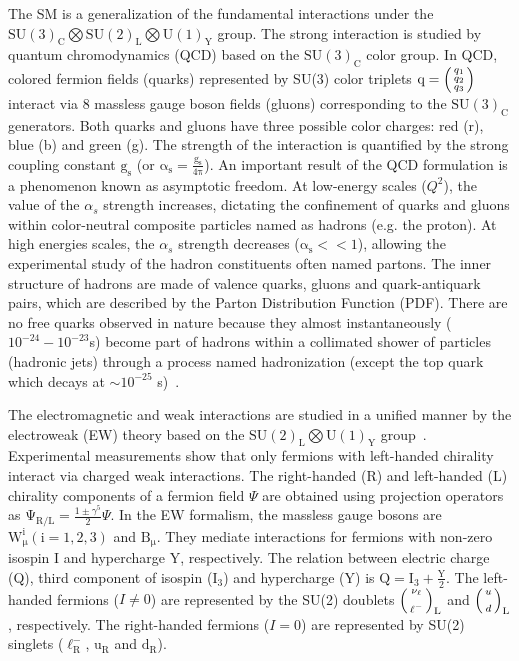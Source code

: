 The SM is a generalization of the fundamental interactions under the $\mathrm{SU(3)_{C} \bigotimes SU(2)_{L}\bigotimes U(1)_{Y} }$ group. The strong interaction is studied by quantum chromodynamics (QCD) based on the $\mathrm{SU(3)_{C}}$ color group. In QCD, colored fermion fields (quarks) represented by SU(3) color triplets $\mathrm{q=\left(\begin{smallmatrix}q_{1}\\q_{2}\\q_{3}\end{smallmatrix}\right)}$ interact via 8 massless gauge boson fields (gluons) corresponding to the $\mathrm{SU(3)_{C}}$ generators. Both quarks and gluons have three possible color charges: red (r), blue (b) and green (g). The strength of the interaction is quantified by the strong coupling constant $\mathrm{g_{s}}$ (or $\mathrm{\alpha_{s} = \frac{g_{s}}{4\pi}}$). An important result of the QCD formulation is a phenomenon known as asymptotic freedom. At low-energy scales ($Q^{2}$), the value of the $\alpha_{s}$ strength increases, dictating the confinement of quarks and gluons within color-neutral composite particles named as hadrons (e.g. the proton). At high energies scales, the $\alpha_{s}$ strength decreases ($\mathrm{\alpha_{s}<<1}$), allowing the experimental study of the hadron constituents often named partons. The inner structure of hadrons are made of valence quarks, gluons and quark-antiquark pairs, which are described by the Parton Distribution Function (PDF). There are no free quarks observed in nature because they almost instantaneously ($10^{-24}-10^{-23}$s) become part of hadrons within a collimated shower of particles (hadronic jets) through a process named hadronization (except the top quark which decays at $\sim10^{-25}$ s)~\cite{costa,pdg}. 

The electromagnetic and weak interactions are studied in a unified manner by the electroweak (EW) theory based on the $\mathrm{SU(2)_{L}\bigotimes U(1)_{Y} }$ group~\cite{Weinberg:1967tq,Salam:1968rm,Glashow:1961tr}. Experimental measurements show that only fermions with left-handed chirality interact via charged weak interactions. The right-handed (R) and left-handed (L) chirality components of a fermion field $\Psi$ are obtained using projection operators as  $\mathrm{\Psi_{R/L}}=\frac{1\pm\gamma^{5}}{2} \Psi$. In the EW formalism, the massless gauge bosons are $\mathrm{W_{\mu}^{i}(i=1,2,3)}$ and $\mathrm{B_{\mu}}$. They mediate interactions for fermions with non-zero isospin I and hypercharge Y, respectively. The relation between electric charge (Q), third component of isospin ($\mathrm{I_{3}}$) and hypercharge (Y) is $\mathrm{Q=I_{3} + \frac{Y}{2} }$. The left-handed fermions ($I\neq0$) are represented by the SU(2) doublets $\mathrm{\left(\begin{smallmatrix}\nu_{\ell} \\ \\ \ell^{-}\end{smallmatrix}\right)_{L}}$ and $\mathrm{\left(\begin{smallmatrix}u \\ \\ d \end{smallmatrix}\right)_{L}}$, respectively. The right-handed fermions ($I=0$) are represented by SU(2) singlets ($\mathrm{\ell^{-}_{R}}$, $\mathrm{u_{R}}$ and $\mathrm{d_{R}}$). 

